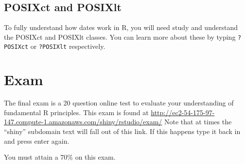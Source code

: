 \documentclass[]{book}
\begin{document}
\section{POSIXct and POSIXlt}\label{posixct-and-posixlt}

To fully understand how dates work in R, you will need study and
understand the POSIXct and POSIXlt classes. You can learn more about
these by typing \texttt{?POSIXct} or \texttt{?POSIXlt} respectively.

\chapter{Exam}\label{exam}

The final exam is a 20 question online test to evaluate your
understanding of fundamental R principles. This exam is found at
\url{http://ec2-54-175-97-147.compute-1.amazonaws.com/shiny/rstudio/exam/}
Note that at times the ``shiny'' subdomain text will fall out of this
link. If this happens type it back in and press enter again.

You must attain a 70\% on this exam.


\end{document}

